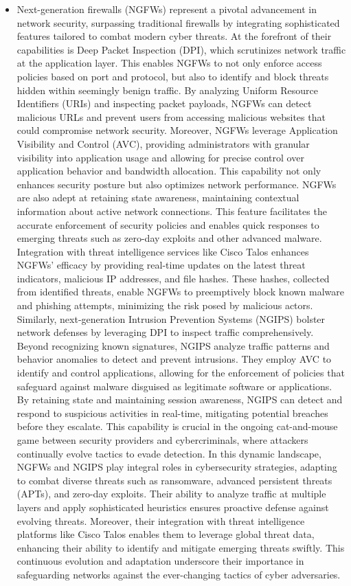 \documentclass{article}
\begin{document}
\begin{itemize}
	\item[] Next-generation firewalls (NGFWs) represent a pivotal advancement in network security, surpassing traditional firewalls by integrating sophisticated features tailored to combat modern cyber threats. At the forefront of their capabilities is Deep Packet Inspection (DPI), which scrutinizes network traffic at the application layer. This enables NGFWs to not only enforce access policies based on port and protocol, but also to identify and block threats hidden within seemingly benign traffic. By analyzing Uniform Resource Identifiers (URIs) and inspecting packet payloads, NGFWs can detect malicious URLs and prevent users from accessing malicious websites that could compromise network security. Moreover, NGFWs leverage Application Visibility and Control (AVC), providing administrators with granular visibility into application usage and allowing for precise control over application behavior and bandwidth allocation. This capability not only enhances security posture but also optimizes network performance. NGFWs are also adept at retaining state awareness, maintaining contextual information about active network connections. This feature facilitates the accurate enforcement of security policies and enables quick responses to emerging threats such as zero-day exploits and other advanced malware. Integration with threat intelligence services like Cisco Talos enhances NGFWs' efficacy by providing real-time updates on the latest threat indicators, malicious IP addresses, and file hashes. These hashes, collected from identified threats, enable NGFWs to preemptively block known malware and phishing attempts, minimizing the risk posed by malicious actors. Similarly, next-generation Intrusion Prevention Systems (NGIPS) bolster network defenses by leveraging DPI to inspect traffic comprehensively. Beyond recognizing known signatures, NGIPS analyze traffic patterns and behavior anomalies to detect and prevent intrusions. They employ AVC to identify and control applications, allowing for the enforcement of policies that safeguard against malware disguised as legitimate software or applications. By retaining state and maintaining session awareness, NGIPS can detect and respond to suspicious activities in real-time, mitigating potential breaches before they escalate. This capability is crucial in the ongoing cat-and-mouse game between security providers and cybercriminals, where attackers continually evolve tactics to evade detection. In this dynamic landscape, NGFWs and NGIPS play integral roles in cybersecurity strategies, adapting to combat diverse threats such as ransomware, advanced persistent threats (APTs), and zero-day exploits. Their ability to analyze traffic at multiple layers and apply sophisticated heuristics ensures proactive defense against evolving threats. Moreover, their integration with threat intelligence platforms like Cisco Talos enables them to leverage global threat data, enhancing their ability to identify and mitigate emerging threats swiftly. This continuous evolution and adaptation underscore their importance in safeguarding networks against the ever-changing tactics of cyber adversaries.

\end{itemize}
\end{document}
